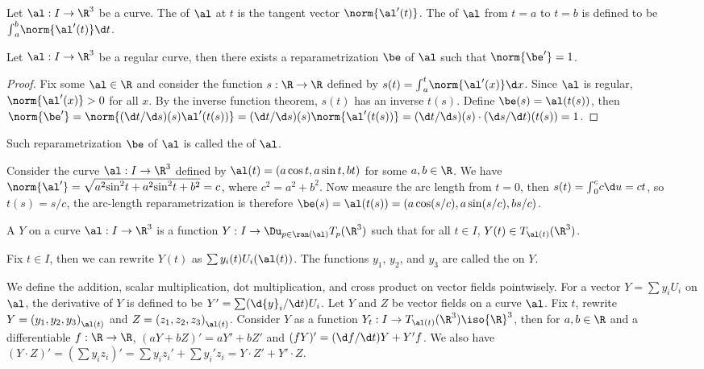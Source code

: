 \documentclass[10pt]{article}
\begin{document}
\begin{definition}
    Let $\al:I\to{\R}^{3}$ be a curve. The  of $\al$ at $t$ is the tangent vector $\norm{\al'(t)}$. The  of $\al$ from $t=a$ to $t=b$ is defined to be ${\int}_{a}^{b}\norm{\al'(t)}\d t$.
\end{definition}
\begin{proposition}
    Let $\al:I\to{\R}^{3}$ be a regular curve, then there exists a reparametrization $\be$ of $\al$ such that $\norm{\be'}=1$.
\end{proposition}
\begin{proof}
    Fix some $\al\in\R$ and consider the function $s:\R\to\R$ defined by $s(t)={\int}_{a}^{t}\norm{\al'(x)}\d x$. Since $\al$ is regular, $\norm{\al'(x)}>0$ for all $x$. By the inverse function theorem, $s(t)$ has an inverse $t(s)$. Define $\be(s)=\al(t(s))$, then $\norm{\be'}=\norm{(\d t/\d s)(s)\al'(t(s))}=(\d t/\d s)(s)\norm{\al'(t(s))}=(\d t/\d s)(s)\cdot(\d s/\d t)(t(s))=1$.
\end{proof}
\par
Such reparametrization $\be$ of $\al$ is called the  of $\al$.
\begin{example}
    Consider the curve $\al:I\to{\R}^{3}$ defined by $\al(t)=(a\cos t,a\sin t,bt)$ for some $a,b\in\R$. We have $\norm{\al'}=\sqrt{{a}^{2}{\sin}^{2}t+{a}^{2}{\sin}^{2}t+{b}^{2}}=c$, where ${c}^{2}={a}^{2}+{b}^{2}$. Now measure the arc length from $t=0$, then $s(t)={\int}_{0}^{c}c\d u=ct$, so $t(s)=s/c$, the arc-length reparametrization is therefore $\be(s)=\al(t(s))=(a\cos(s/c),a\sin(s/c),bs/c)$.
\end{example}
\begin{definition}
    A  $Y$ on a curve $\al:I\to{\R}^{3}$ is a function $Y:I\to{\Du}_{p\in\ran(\al)}{T}_{p}({\R}^{3})$ such that for all $t\in I$, $Y(t)\in{T}_{\al(t)}({\R}^{3})$.
\end{definition}
\par
Fix $t\in I$, then we can rewrite $Y(t)$ as $\sum{y}_{i}(t){U}_{i}(\al(t))$. The functions ${y}_{1}$, ${y}_{2}$, and ${y}_{3}$ are called the  on $Y$.
\par
We define the addition, scalar multiplication, dot multiplication, and cross product on vector fields pointwisely. For a vector $Y=\sum{y}_{i}{U}_{i}$ on $\al$, the derivative of $Y$ is defined to be $Y'=\sum(\d{y}_{i}/\d t){U}_{i}$. Let $Y$ and $Z$ be vector fields on a curve $\al$. Fix $t$, rewrite $Y={({y}_{1},{y}_{2},{y}_{3})}_{\al(t)}$ and $Z={({z}_{1},{z}_{2},{z}_{3})}_{\al(t)}$. Consider $Y$ as a function ${Y}_{t}:I\to{T}_{\al(t)}({\R}^{3})\iso{\R}^{3}$, then for $a,b\in\R$ and a differentiable $f:\R\to\R$, $(aY+bZ)'=aY'+bZ'$ and $(fY)'=(\d f/\d t)Y+Y'f$. We also have $(Y\cdot Z)'=(\sum{y}_{i}{z}_{i})'=\sum{y}_{i}{z}_{i}'+\sum{y}_{i}'{z}_{i}=Y\cdot Z'+Y'\cdot Z$.
\end{document}
